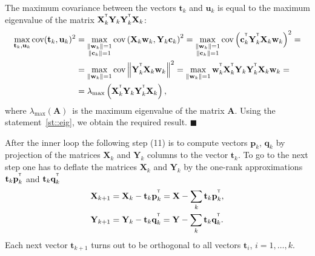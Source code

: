 \documentclass[12pt,twoside]{article}
\newcommand{\bw}{\mathbf{w}}
\newcommand{\bY}{\mathbf{Y}}
\newcommand{\bX}{\mathbf{X}}
\newcommand{\bu}{\mathbf{u}}
\newcommand{\bt}{\mathbf{t}}
\newcommand{\bp}{\mathbf{p}}
\newcommand{\bq}{\mathbf{q}}
\newcommand{\bc}{\mathbf{c}}
\newcommand{\T}{^{\text{\tiny\sffamily\upshape\mdseries T}}}
\begin{document}
The maximum covariance between the vectors $\bt_k$ and $\bu_k$ is equal to the maximum eigenvalue of the matrix $\bX_k^{\T} \bY_k \bY_k^{\T} \bX_k$:
\begin{align*}
\max_{\bt_k, \bu_k}  \text{cov} (\bt_k, \bu_k)^2 &= \max_{\substack{\|\bw_k\|=1 \\ \|\bc_k\| = 1}} \text{cov} \left( \bX_k \bw_k, \bY_k \bc_k \right)^2 = \max_{\substack{\|\bw_k\|=1 \\ \|\bc_k\| = 1}} \text{cov} \left(\bc_k^{\T}  \bY_k^{\T} \bX_k \bw_k \right)^2 = \\
&= \max_{\|\bw_k\| = 1} \text{cov} \left\|\bY_k^{\T} \bX_k \bw_k \right\|^2 = \max_{\|\bw_k\| = 1} \bw_k^{\T} \bX_k^{\T} \bY_k \bY_k^{\T} \bX_k \bw_k = \\
& = \lambda_{\max} \left( \bX_k^{\T} \bY_k \bY_k^{\T} \bX_k \right),
\end{align*}
where $ \lambda_{\max} (\mathbf{A})$~is the maximum eigenvalue of the matrix $\mathbf{A}$.
Using the statement~\ref{st::eig}, we obtain the required result.
$\blacksquare$

After the inner loop the following step (11) is to compute vectors $\bp_k$, $\bq_k$ by projection of the matrices $\bX_k$ and $\bY_k$ columns to the vector $\bt_k$. 
To go to the next step one has to deflate the matrices $\bX_k$ and $\bY_k$ by the one-rank approximations $\bt_k \bp_k^{\T}$ and $\bt_k \bq_k^{\T}$
\begin{align*}
    \bX_{k + 1} &= \bX_{k} - \bt_k \bp_k^{\T} = \bX - \sum_k \bt_k \bp_k^{\T}, \\
    \bY_{k + 1} &= \bY_{k} - \bt_k \bq_k^{\T} = \bY - \sum_k \bt_k \bq_k^{\T}.
\end{align*}
Each next vector $\bt_{k+1}$ turns out to be orthogonal to all vectors $\bt_i$, $i=1, \dots, k$.
\end{document}
